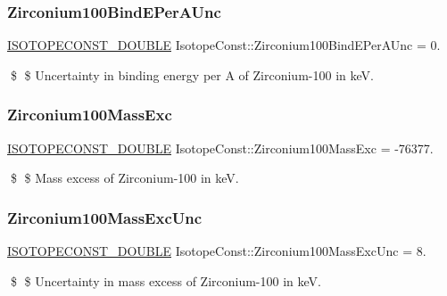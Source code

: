 \subsubsection{\texorpdfstring{Zirconium100\+Bind\+E\+Per\+A\+Unc}{Zirconium100BindEPerAUnc}}
{\footnotesize\ttfamily \mbox{\hyperlink{group___isotope_const-_macros_ga8f45a7272ce02c0b4c65c44636ed719a}{I\+S\+O\+T\+O\+P\+E\+C\+O\+N\+S\+T\+\_\+\+D\+O\+U\+B\+LE}} Isotope\+Const\+::\+Zirconium100\+Bind\+E\+Per\+A\+Unc = 0.}

\$ \$ Uncertainty in binding energy per A of Zirconium-\/100 in keV. \mbox{\label{group___isotope_const-_zirconium-_zr100_ga8bda9246be44e6ee95a487bf16aa4d64}} 
\subsubsection{\texorpdfstring{Zirconium100\+Mass\+Exc}{Zirconium100MassExc}}
{\footnotesize\ttfamily \mbox{\hyperlink{group___isotope_const-_macros_ga8f45a7272ce02c0b4c65c44636ed719a}{I\+S\+O\+T\+O\+P\+E\+C\+O\+N\+S\+T\+\_\+\+D\+O\+U\+B\+LE}} Isotope\+Const\+::\+Zirconium100\+Mass\+Exc = -\/76377.}

\$ \$ Mass excess of Zirconium-\/100 in keV. \mbox{\label{group___isotope_const-_zirconium-_zr100_ga8d27b58fc10766de79b3062fc5a09371}} 
\subsubsection{\texorpdfstring{Zirconium100\+Mass\+Exc\+Unc}{Zirconium100MassExcUnc}}
{\footnotesize\ttfamily \mbox{\hyperlink{group___isotope_const-_macros_ga8f45a7272ce02c0b4c65c44636ed719a}{I\+S\+O\+T\+O\+P\+E\+C\+O\+N\+S\+T\+\_\+\+D\+O\+U\+B\+LE}} Isotope\+Const\+::\+Zirconium100\+Mass\+Exc\+Unc = 8.}

\$ \$ Uncertainty in mass excess of Zirconium-\/100 in keV. \mbox{\label{group___isotope_const-_zirconium-_zr100_gae9f557aad2a2561517acd240db85a0dd}} 
